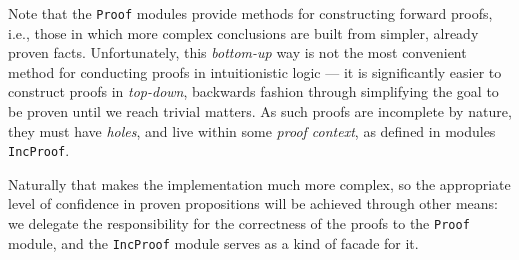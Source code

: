 \documentclass[english, mgr]{iithesis}
\renewcommand{\tt}[1]{\texttt{\small{#1}}}
\renewcommand{\it}[1]{\textit{#1}}
\begin{document}
Note that the \tt{Proof} modules provide methods for constructing forward proofs, i.e., those in which more complex conclusions are built from simpler, already proven facts.
Unfortunately, this \it{bottom-up} way is not the most convenient method for conducting proofs in intuitionistic logic --- it is significantly easier to construct proofs in \it{top-down}, backwards fashion through simplifying the goal to be proven until we reach trivial matters.
As such proofs are incomplete by nature, they must have \it{holes},
and live within some \it{proof context}, as defined in modules \tt{IncProof}.

Naturally that makes the implementation much more complex, so the appropriate level of confidence in proven propositions will be achieved through other means:
we delegate the responsibility for the correctness of the proofs to the \tt{Proof} module, and the \tt{IncProof} module serves as a kind of facade for it.
\end{document}
